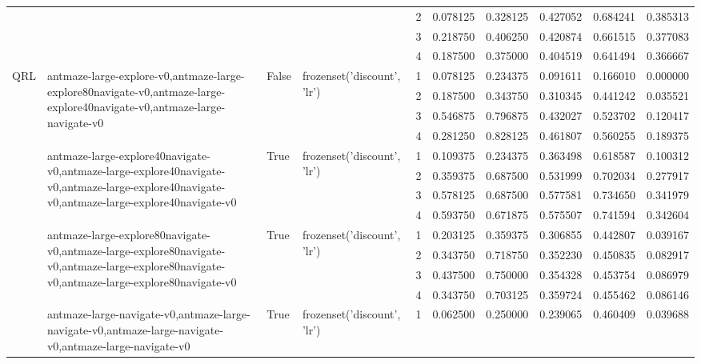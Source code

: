 \begin{tabular}{lllllrrrrr}
 &  &  &  & 2 & 0.078125 & 0.328125 & 0.427052 & 0.684241 & 0.385313 \\
 &  &  &  & 3 & 0.218750 & 0.406250 & 0.420874 & 0.661515 & 0.377083 \\
 &  &  &  & 4 & 0.187500 & 0.375000 & 0.404519 & 0.641494 & 0.366667 \\
\cline{1-10} \cline{2-10} \cline{3-10} \cline{4-10}
\multirow[t]{32}{*}{QRL} & \multirow[t]{4}{*}{antmaze-large-explore-v0,antmaze-large-explore80navigate-v0,antmaze-large-explore40navigate-v0,antmaze-large-navigate-v0} & \multirow[t]{4}{*}{False} & \multirow[t]{4}{*}{frozenset({'discount', 'lr'})} & 1 & 0.078125 & 0.234375 & 0.091611 & 0.166010 & 0.000000 \\
 &  &  &  & 2 & 0.187500 & 0.343750 & 0.310345 & 0.441242 & 0.035521 \\
 &  &  &  & 3 & 0.546875 & 0.796875 & 0.432027 & 0.523702 & 0.120417 \\
 &  &  &  & 4 & 0.281250 & 0.828125 & 0.461807 & 0.560255 & 0.189375 \\
\cline{2-10} \cline{3-10} \cline{4-10}
 & \multirow[t]{4}{*}{antmaze-large-explore40navigate-v0,antmaze-large-explore40navigate-v0,antmaze-large-explore40navigate-v0,antmaze-large-explore40navigate-v0} & \multirow[t]{4}{*}{True} & \multirow[t]{4}{*}{frozenset({'discount', 'lr'})} & 1 & 0.109375 & 0.234375 & 0.363498 & 0.618587 & 0.100312 \\
 &  &  &  & 2 & 0.359375 & 0.687500 & 0.531999 & 0.702034 & 0.277917 \\
 &  &  &  & 3 & 0.578125 & 0.687500 & 0.577581 & 0.734650 & 0.341979 \\
 &  &  &  & 4 & 0.593750 & 0.671875 & 0.575507 & 0.741594 & 0.342604 \\
\cline{2-10} \cline{3-10} \cline{4-10}
 & \multirow[t]{4}{*}{antmaze-large-explore80navigate-v0,antmaze-large-explore80navigate-v0,antmaze-large-explore80navigate-v0,antmaze-large-explore80navigate-v0} & \multirow[t]{4}{*}{True} & \multirow[t]{4}{*}{frozenset({'discount', 'lr'})} & 1 & 0.203125 & 0.359375 & 0.306855 & 0.442807 & 0.039167 \\
 &  &  &  & 2 & 0.343750 & 0.718750 & 0.352230 & 0.450835 & 0.082917 \\
 &  &  &  & 3 & 0.437500 & 0.750000 & 0.354328 & 0.453754 & 0.086979 \\
 &  &  &  & 4 & 0.343750 & 0.703125 & 0.359724 & 0.455462 & 0.086146 \\
\cline{2-10} \cline{3-10} \cline{4-10}
 & \multirow[t]{4}{*}{antmaze-large-navigate-v0,antmaze-large-navigate-v0,antmaze-large-navigate-v0,antmaze-large-navigate-v0} & \multirow[t]{4}{*}{True} & \multirow[t]{4}{*}{frozenset({'discount', 'lr'})} & 1 & 0.062500 & 0.250000 & 0.239065 & 0.460409 & 0.039688 \\

\end{tabular}
